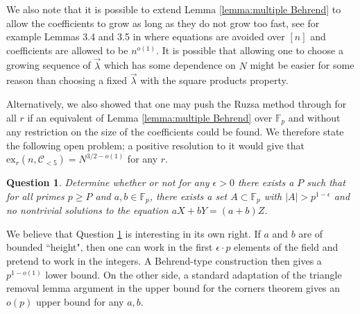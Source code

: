 \documentclass[12pt]{article}%
\newtheorem{question}[theorem]{Question}
\def\mike#1{\noindent
\textcolor{green}
{\textsc{(Mike:}
\textsf{#1})}}
\begin{document}


We also note that it is possible to extend Lemma \ref{lemma:multiple Behrend} to allow the coefficients to grow as long as they do not grow too fast, see for example Lemmas 3.4 and 3.5 in \cite{Ge} where equations are avoided over $[n]$ and coefficients are allowed to be $n^{o(1)}$. It is possible that allowing one to choose a growing sequence of $\vec{\lambda}$ which has some dependence on $N$ might be easier for some reason than choosing a fixed $\vec{\lambda}$ with the square products property. 

Alternatively, we also showed that one may push the Ruzsa method through for all $r$ if an equivalent of Lemma \ref{lemma:multiple Behrend} over $\mathbb{F}_p$ and without any restriction on the size of the coefficients could be found. We therefore state the following open problem; a positive resolution to it would give that $\mathrm{ex}_r(n, \mathcal{C}_{<5}) = N^{3/2-o(1)}$ for any $r$.

\begin{question}\label{behrend over field question}
Determine whether or not for any $\epsilon > 0$ there exists a $P$ such that for all primes $p \geq P$ and $a,b\in \mathbb{F}_p$, there exists a set $A\subset \mathbb{F}_p$ with $|A| > p^{1-\epsilon}$ and no nontrivial solutions to the equation $aX + bY = (a+b)Z$.
\end{question}


We believe that Question \ref{behrend over field question} is interesting in its own right. If $a$ and $b$ are of bounded ``height", then one can work in the first $\epsilon\cdot p$ elements of the field and pretend to work in the integers. %
A Behrend-type construction then gives a $p^{1-o(1)}$ lower bound. On the other side, a standard adaptation of the triangle removal lemma argument in the upper bound for the corners theorem gives an $o(p)$ upper bound for any $a,b$. 
\end{document}
